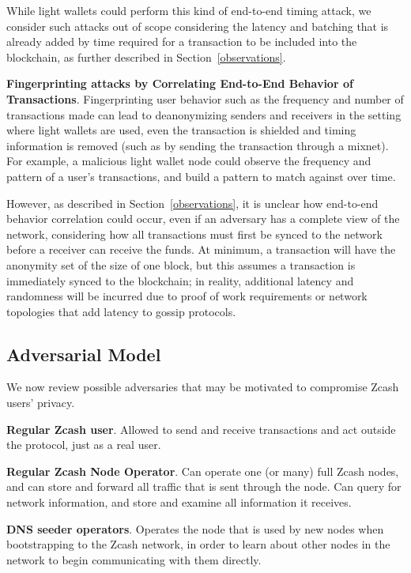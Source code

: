 \documentclass{article}
\newcounter{mn}
\begin{document}
While light wallets could perform this kind of end-to-end timing attack, we
consider such attacks out of scope considering the latency and batching that is
already added by time required for a transaction to be included into the
blockchain, as further described in Section~\ref{observations}.

\textbf{Fingerprinting attacks by Correlating End-to-End Behavior of Transactions}.
Fingerprinting user behavior such as the frequency and number of transactions
made can lead to deanonymizing senders and receivers in the setting where light
wallets are used, even the transaction is shielded and timing information is
removed (such as by sending the transaction through a mixnet).
For example, a malicious light wallet node could observe
the frequency and pattern of a user’s transactions, and build a pattern to
match against over time.

However, as described in Section~\ref{observations}, it is unclear how
end-to-end behavior correlation could occur, even if an adversary has a
complete view of the network, considering how all transactions must first be
synced to the network before a receiver can receive the funds. At minimum, a
transaction will have the anonymity set of the size of one block, but this
assumes a transaction is immediately synced to the blockchain; in reality,
additional latency and randomness will be incurred due to proof of work
requirements or network topologies that add latency to gossip protocols.

\subsection{Adversarial Model}

We now review possible adversaries that may be motivated to compromise Zcash users'
privacy.

\textbf{Regular Zcash user}. Allowed to send and receive transactions and act
outside the protocol, just as a real user.

\textbf{Regular Zcash Node Operator}. Can operate one (or many) full Zcash
nodes, and can store and forward all traffic that is sent through the node. Can
query for network information, and store and examine all information it
receives.

\textbf{DNS seeder operators}. Operates the node that is used by new nodes when
bootstrapping to the Zcash network, in order to learn about other nodes in the
network to begin communicating with them directly.
\end{document}
